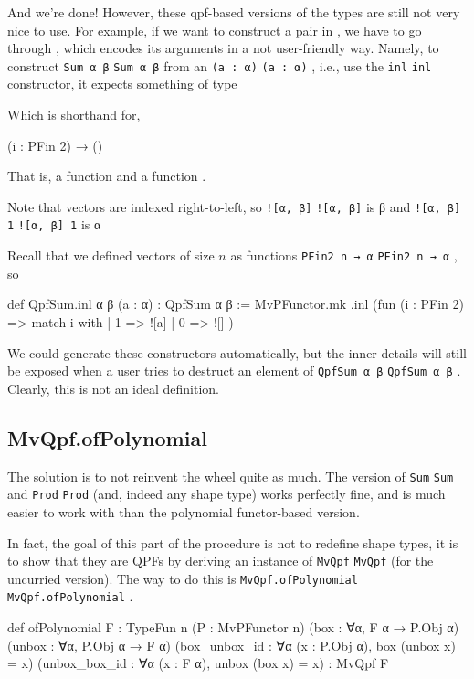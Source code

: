 \documentclass[titlepage]{report}
\newenvironment{remark}{%
\begin{framed}
\begin{trivlist}
    \item[\hskip \labelsep {\bfseries Remark:}]}%
{%
\end{trivlist}%
\end{framed}
}
\newcommand\lean[1]{%
\ifx\leanmode\undefined%
\def\leanmode{1}%
\texttt{\small #1}%
\undef\leanmode%
\else%
\texttt{#1}%
\fi%
}
\begin{document}
And we're done! However, these qpf-based versions of the types are still not very nice to use.
For example, if we want to construct a pair in , we have to go through ,
which encodes its arguments in a not user-friendly way. 
Namely, to construct \lean{Sum α β} from an \lean{(a : α)}, i.e., use the \lean{inl} constructor, 
it expects something of type
\begin{center}
\end{center}
Which is shorthand for, 
\begin{center}
    (i : PFin 2) → ()
\end{center}
That is, a function  and a function .
\begin{remark}
    Note that vectors are indexed right-to-left, so \lean{![α, β]} is β
    and \lean{![α, β] 1} is α
\end{remark}

Recall that we defined vectors of size $n$ as functions \lean{PFin2 n → α}, so 


\begin{leancode}
    def QpfSum.inl {α β} (a : α) : QpfSum α β :=
      MvPFunctor.mk .inl (fun (i : PFin 2) => match i with
        | 1 => ![a]
        | 0 => ![]
      )
\end{leancode}


We could generate these constructors automatically, but the inner details will still be exposed
when a user tries to destruct an element of \lean{QpfSum α β}.
Clearly, this is not an ideal definition.

\subsection{MvQpf.ofPolynomial}
The solution is to not reinvent the wheel quite as much.
The  version of \lean{Sum} and \lean{Prod} (and, indeed any shape type) works
perfectly fine, and is much easier to work with than the polynomial functor-based version.

In fact, the goal of this part of the procedure is not to redefine shape types, it is to show that
they are QPFs by deriving an instance of \lean{MvQpf} (for the uncurried version).
The way to do this is \lean{MvQpf.ofPolynomial}.

\begin{leancode}
    def ofPolynomial {F : TypeFun n} 
                     (P : MvPFunctor n) 
                     (box    : ∀{α}, F α → P.Obj α) 
                     (unbox  : ∀{α}, P.Obj α → F α) 
                     (box_unbox_id : ∀{α} (x : P.Obj α), box (unbox x) = x)
                     (unbox_box_id : ∀{α} (x : F α), unbox (box x) = x)
                  : MvQpf F
\end{leancode}
\end{document}
